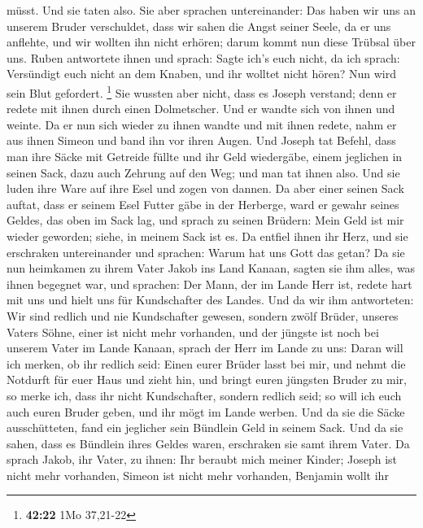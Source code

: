müsst. Und sie taten also.  Sie aber sprachen
untereinander: Das haben wir uns an unserem Bruder verschuldet, dass wir
sahen die Angst seiner Seele, da er uns anflehte, und wir wollten ihn
nicht erhören; darum kommt nun diese Trübsal über uns. 
Ruben antwortete ihnen und sprach: Sagte ich's euch nicht, da ich
sprach: Versündigt euch nicht an dem Knaben, und ihr wolltet nicht
hören? Nun wird sein Blut gefordert. \footnote{\textbf{42:22} 1Mo
  37,21-22}  Sie wussten aber nicht, dass es Joseph
verstand; denn er redete mit ihnen durch einen Dolmetscher.
 Und er wandte sich von ihnen und weinte. Da er nun sich
wieder zu ihnen wandte und mit ihnen redete, nahm er aus ihnen Simeon
und band ihn vor ihren Augen.  Und Joseph tat Befehl, dass
man ihre Säcke mit Getreide füllte und ihr Geld wiedergäbe, einem
jeglichen in seinen Sack, dazu auch Zehrung auf den Weg; und man tat
ihnen also.  Und sie luden ihre Ware auf ihre Esel und
zogen von dannen.  Da aber einer seinen Sack auftat, dass
er seinem Esel Futter gäbe in der Herberge, ward er gewahr seines
Geldes, das oben im Sack lag,  und sprach zu seinen
Brüdern: Mein Geld ist mir wieder geworden; siehe, in meinem Sack ist
es. Da entfiel ihnen ihr Herz, und sie erschraken untereinander und
sprachen: Warum hat uns Gott das getan?  Da sie nun
heimkamen zu ihrem Vater Jakob ins Land Kanaan, sagten sie ihm alles,
was ihnen begegnet war, und sprachen:  Der Mann, der im
Lande Herr ist, redete hart mit uns und hielt uns für Kundschafter des
Landes.  Und da wir ihm antworteten: Wir sind redlich und
nie Kundschafter gewesen,  sondern zwölf Brüder, unseres
Vaters Söhne, einer ist nicht mehr vorhanden, und der jüngste ist noch
bei unserem Vater im Lande Kanaan,  sprach der Herr im
Lande zu uns: Daran will ich merken, ob ihr redlich seid: Einen eurer
Brüder lasst bei mir, und nehmt die Notdurft für euer Haus und zieht
hin,  und bringt euren jüngsten Bruder zu mir, so merke
ich, dass ihr nicht Kundschafter, sondern redlich seid; so will ich euch
auch euren Bruder geben, und ihr mögt im Lande werben.  Und
da sie die Säcke ausschütteten, fand ein jeglicher sein Bündlein Geld in
seinem Sack. Und da sie sahen, dass es Bündlein ihres Geldes waren,
erschraken sie samt ihrem Vater.  Da sprach Jakob, ihr
Vater, zu ihnen: Ihr beraubt mich meiner Kinder; Joseph ist nicht mehr
vorhanden, Simeon ist nicht mehr vorhanden, Benjamin wollt ihr
